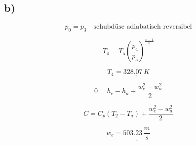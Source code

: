 

\subsection*{b)}

\[
p_0 = p_3 \quad \text{schubdüse adiabatisch reversibel}
\]

\[
T_4 = T_5 \left( \frac{p_4}{p_5} \right)^{\frac{n-1}{n}}
\]

\[
T_4 = \underline{328.07 \, K}
\]

\[
0 = h_e - h_a + \frac{w_e^2 - w_a^2}{2}
\]

\[
C = C_p (T_2 - T_a) + \frac{w_e^2 - w_a^2}{2}
\]

\[
w_e = \underline{503.23 \, \frac{m}{s}}
\]